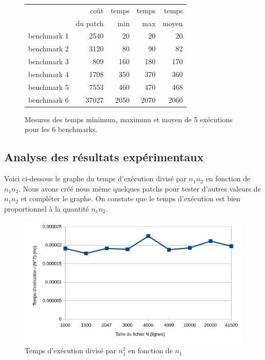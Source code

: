 \documentclass[a4paper, 10pt, french]{article}
\begin{document}
    \begin{figure}[h!]
      \begin{center}
        \begin{tabular}{|l||r||r|r|r||}
          \hline
          \hline
            & coût         & temps     & temps   & temps \\
            & du patch     & min       & max     & moyen \\
          \hline
          \hline
            benchmark 1 & 2540 & 20 & 20 & 20 \\
          \hline
            benchmark 2 & 3120 & 80 & 90 & 82 \\
          \hline
            benchmark 3 & 809 & 160 & 180 & 170 \\
          \hline
            benchmark 4 & 1708 & 350 & 370 & 360 \\
          \hline
            benchmark 5 & 7553 & 460 & 470 & 468 \\
          \hline
            benchmark 6 & 37027 & 2050 & 2070 & 2060 \\
          \hline
          \hline
        \end{tabular}
        \caption{Mesures des temps minimum, maximum et moyen de 5 exécutions pour les 6 benchmarks.}
        \label{table-temps}
      \end{center}
    \end{figure}

\newpage
\subsection{Analyse des résultats expérimentaux}

Voici ci-dessous le graphe du temps d'exécution divisé par $n_1n_2$ en fonction de $n_1n_2$.
Nous avons créé nous même quelques patchs pour tester d'autres valeurs de $n_1n_2$ et compléter le graphe.
On constate que le temps d'exécution est bien proportionnel à la quantité $n_1n_2$.


\begin{figure}[h!]
\begin{center}
\includegraphics[width=12cm]{exec.png}
\caption{Temps d'exécution divisé par $n_1^2$ en fonction de $n_1$}
\end{center}
\end{figure}
\end{document}
